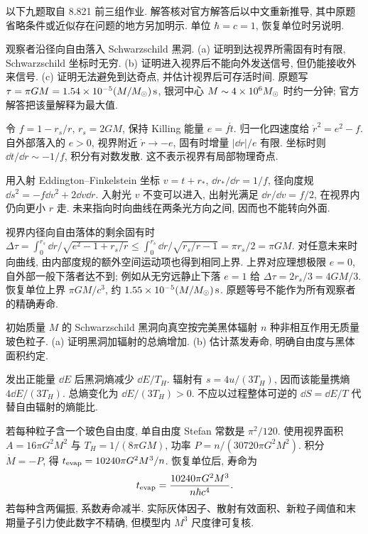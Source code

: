 以下九题取自 8.821 前三组作业. 解答核对官方解答后以中文重新推导, 其中原题省略条件或近似存在问题的地方另加明示. 单位 $\hbar=c=1$, 恢复单位时另说明.

\begin{exercise}
观察者沿径向自由落入 Schwarzschild 黑洞.
(a) 证明到达视界所需固有时有限, Schwarzschild 坐标时无穷.
(b) 证明进入视界后不能向外发送信号, 但仍能接收外来信号.
(c) 证明无法避免到达奇点, 并估计视界后可存活时间. 原题写 $\tau=\pi GM=1.54\times10^{-5}(M/M_{\odot})\,\mathrm s$, 银河中心 $M\sim4\times10^6M_{\odot}$ 时约一分钟; 官方解答把该量解释为最大值.
\end{exercise}
\begin{solution}
令 $f=1-r_s/r$, $r_s=2GM$, 保持 Killing 能量 $e=f\dot t$. 归一化四速度给 $\dot r^2=e^2-f$. 自外部落入的 $e>0$, 视界附近 $\dot r\to-e$, 固有时增量 $|\dd r|/e$ 有限. 坐标时则 $\dd t/\dd r\sim-1/f$, 积分有对数发散. 这不表示视界有局部物理奇点.

用入射 Eddington--Finkelstein 坐标 $v=t+r_*$, $\dd r_*/\dd r=1/f$, 径向度规 $\dd s^2=-f\dd v^2+2\dd v\dd r$. 入射光 $v$ 不变可以进入, 出射光满足 $\dd r/\dd v=f/2$, 在视界内仍向更小 $r$ 走. 未来指向时向曲线在两条光方向之间, 因而也不能转向外面.

视界内径向自由落体的剩余固有时 $\Delta\tau=\int_0^{r_s}\dd r/\sqrt{e^2-1+r_s/r}\le\int_0^{r_s}\dd r/\sqrt{r_s/r-1}=\pi r_s/2=\pi GM$. 对任意未来时向曲线, 由内部度规的额外空间运动项也得到相同上界. 上界对应理想极限 $e=0$, 自外部一般下落者达不到; 例如从无穷远静止下落 $e=1$ 给 $\Delta\tau=2r_s/3=4GM/3$. 恢复单位上界 $\pi GM/c^3$, 约 $1.55\times10^{-5}(M/M_{\odot})\,\mathrm s$. 原题等号不能作为所有观察者的精确寿命.
\end{solution}

\begin{exercise}
初始质量 $M$ 的 Schwarzschild 黑洞向真空按完美黑体辐射 $n$ 种非相互作用无质量玻色粒子.
(a) 证明黑洞加辐射的总熵增加.
(b) 估计蒸发寿命, 明确自由度与黑体面积约定.
\end{exercise}
\begin{solution}
发出正能量 $\dd E$ 后黑洞熵减少 $\dd E/T_H$. 辐射有 $s=4u/(3T_H)$, 因而该能量携熵 $4\dd E/(3T_H)$. 总熵变化为 $\dd E/(3T_H)>0$. 不应以过程整体可逆的 $\dd S=\dd E/T$ 代替自由辐射的熵能比.

若每种粒子含一个玻色自由度, 单自由度 Stefan 常数是 $\pi^2/120$. 使用视界面积 $A=16\pi G^2M^2$ 与 $T_H=1/(8\pi GM)$, 功率 $P=n/(30720\pi G^2M^2)$. 积分 $\dot M=-P$, 得 $t_{\rm evap}=10240\pi G^2M^3/n$. 恢复单位后, 寿命为\[t_{\rm evap}=\frac{10240\pi G^2M^3}{n\hbar c^4}.\] 若每种含两偏振, 系数寿命减半. 实际灰体因子、散射有效面积、新粒子阈值和末期量子引力使此数字不精确, 但模型内 $M^3$ 尺度律可复核.
\end{solution}

